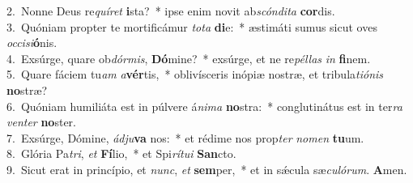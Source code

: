 {2.~}Nonne Deus re\textit{quí}\textit{ret} \textbf{i}sta?~* ipse enim novit ab\textit{scón}\textit{di}\textit{ta} \textbf{cor}dis.\\
{3.~}Quóniam propter te mortificámur \textit{to}\textit{ta} \textbf{di}e:~* æstimáti sumus sicut oves \textit{oc}\textit{ci}\textit{si}\textbf{ó}nis.\\
{4.~}Exsúrge, quare ob\textit{dór}\textit{mis}, \textbf{Dó}mine?~* exsúrge, et ne re\textit{pél}\textit{las} \textit{in} \textbf{fi}nem.\\
{5.~}Quare fáciem tu\textit{am} \textit{a}\textbf{vér}tis,~* oblivísceris inópiæ nostræ, et tribula\textit{ti}\textit{ó}\textit{nis} \textbf{no}stræ?\\
{6.~}Quóniam humiliáta est in púlvere á\textit{ni}\textit{ma} \textbf{no}stra:~* conglutinátus est in ter\textit{ra} \textit{ven}\textit{ter} \textbf{no}ster.\\
{7.~}Exsúrge, Dómine, \textit{ád}\textit{ju}\textbf{va} nos:~* et rédime nos prop\textit{ter} \textit{no}\textit{men} \textbf{tu}um.\\
{8.~}Glória Pa\textit{tri}, \textit{et} \textbf{Fí}lio,~* et Spi\textit{rí}\textit{tu}\textit{i} \textbf{San}cto.\\
{9.~}Sicut erat in princípio, et \textit{nunc}, \textit{et} \textbf{sem}per,~* et in sǽcula sæ\textit{cu}\textit{ló}\textit{rum}. \textbf{A}men.\\
